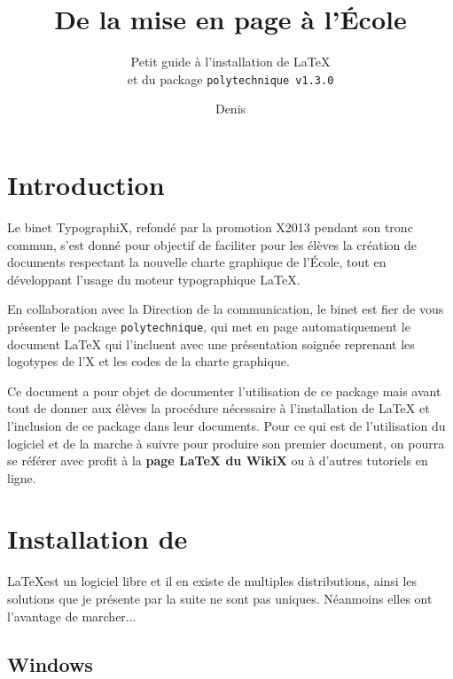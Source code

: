 \documentclass[a4paper,12pt,twoside]{article}
\title{De la mise en page à l'École}
\subtitle{Petit guide à l'installation de \textrm{\LaTeX}\\et du package \textup{\texttt{polytechnique v1.3.0}}}
\author{Denis \bsc{Merigoux}}
\begin{document}
\maketitle

\section{Introduction}

Le binet TypographiX, refondé par la promotion X2013 pendant son tronc commun, s'est donné pour objectif de faciliter pour les élèves la création de documents respectant la nouvelle charte graphique de l'École, tout en développant l'usage du moteur typographique \LaTeX.

En collaboration avec la Direction de la communication, le binet est fier de vous présenter le package \texttt{polytechnique}, qui met en page automatiquement le document \LaTeX{} qui l'incluent avec une présentation soignée reprenant les logotypes de l'X et les codes de la charte graphique.

Ce document a pour objet de documenter l'utilisation de ce package mais avant tout de donner aux élèves la procédure nécessaire à l'installation de \LaTeX{} et l'inclusion de ce package dans leur documents. Pour ce qui est de l'utilisation du logiciel et de la marche à suivre pour produire son premier document, on pourra se référer avec profit à la \textbf{page LaTeX du WikiX} ou à d'autres tutoriels en ligne.

\section{Installation de \rmfamily{\LaTeX}}

\LaTeX est un logiciel libre et il en existe de multiples distributions, ainsi les solutions que je présente par la suite ne sont pas uniques. Néanmoins elles ont l'avantage de marcher...

\subsection{Windows}
\end{document}
